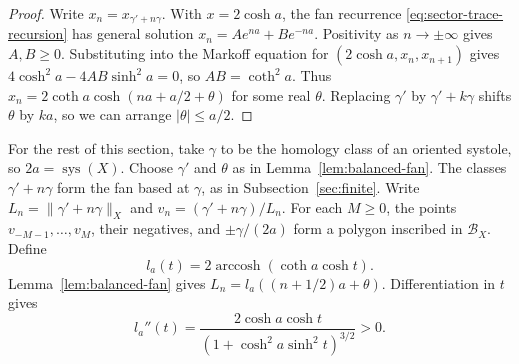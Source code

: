 \documentclass[10pt,twoside]{article}
\theoremstyle{plain}
\theoremstyle{definition}
\theoremstyle{remark}
\DeclareMathOperator{\sys}{sys}
\newcommand{\B}{\mathcal B}
\begin{document}
\begin{proof}
Write $x_n=x_{\gamma'+n\gamma}$. With $x=2\cosh a$, the fan
recurrence \eqref{eq:sector-trace-recursion} has general solution
$x_n=Ae^{na}+Be^{-na}$. Positivity as $n\to\pm\infty$ gives
$A,B\geq0$. Substituting into the Markoff equation for
$(2\cosh a,x_n,x_{n+1})$ gives
$4\cosh^2 a-4AB\sinh^2 a=0$, so $AB=\coth^2 a$.
Thus $x_n=2\coth a\cosh(na+a/2+\theta)$ for some real $\theta$.
Replacing $\gamma'$ by $\gamma'+k\gamma$ shifts $\theta$ by $ka$,
so we can arrange $|\theta|\leq a/2$.
\end{proof}

For the rest of this section, take $\gamma$ to be the homology class of an
oriented systole, so $2a=\sys(X)$. Choose $\gamma'$ and $\theta$ as in
Lemma~\ref{lem:balanced-fan}. The classes $\gamma'+n\gamma$ form the
fan based at $\gamma$, as in Subsection~\ref{sec:finite}.
Write $L_n=\|\gamma'+n\gamma\|_X$ and
$v_n=(\gamma'+n\gamma)/L_n$.
For each $M\geq0$, the points $v_{-M-1},\ldots,v_M$, their negatives,
and $\pm\gamma/(2a)$ form a polygon inscribed in $\B_X$.
Define
\begin{equation}
\label{eq:fan-length-function}
l_a(t)=2\operatorname{arccosh}(\coth a\cosh t).
\end{equation}
Lemma~\ref{lem:balanced-fan} gives $L_n=l_a((n+1/2)a+\theta)$.
Differentiation in $t$ gives
\begin{equation}
\label{eq:fan-curvature-function}
l_a''(t)=\frac{2\cosh a\cosh t}{(1+\cosh^2a\sinh^2t)^{3/2}}>0.
\end{equation}
\end{document}
